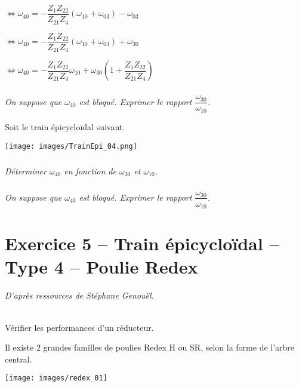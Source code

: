 \documentclass[10pt,fleqn]{article} %
\begin{document}
\begin{multicols}{2}
\begin{multicols}{2}
\begin{corrige}
  $\Leftrightarrow \omega_{40}=-\dfrac{Z_{1}Z_{22}}{Z_{21}Z_{4}}\left( \omega_{10}+\omega_{03} \right)-\omega_{03}$
  
    $\Leftrightarrow \omega_{40}=-\dfrac{Z_{1}Z_{22}}{Z_{21}Z_{4}}\left( \omega_{10}+\omega_{03} \right)+\omega_{30}$
    
      $\Leftrightarrow \omega_{40}=-\dfrac{Z_{1}Z_{22}}{Z_{21}Z_{4}}\omega_{10}+\omega_{30}\left( 1+\dfrac{Z_{1}Z_{22}}{Z_{21}Z_{4}} \right)$

 \end{corrige}
 \else
 \fi


\subparagraph{}
\textit{On suppose que $\omega_{40}$ est bloqué. Exprimer le rapport $\dfrac{\omega_{30}}{\omega_{10}}$.}



Soit le train épicycloïdal suivant. 

\begin{center}
 \texttt{[image: images/TrainEpi\_04.png]}
\end{center}

\subparagraph{}
\textit{Déterminer $\omega_{40}$ en fonction de  $\omega_{30}$ et $\omega_{10}$.}

\subparagraph{}
\textit{On suppose que $\omega_{40}$ est bloqué. Exprimer le rapport $\dfrac{\omega_{30}}{\omega_{10}}$.}



%

\section*{Exercice 5 -- Train épicycloïdal -- Type 4 -- Poulie Redex}
\setcounter{exo}{0}

\textit{D'après ressources de Stéphane Genouël.}


\begin{obj}~\\
Vérifier les performances d'un réducteur.
\end{obj}

Il existe 2 grandes familles de poulies Redex H ou SR, selon la forme de l’arbre central.


\begin{center}
\texttt{[image: images/redex\_01]}
\end{center}




\end{multicols}
\end{multicols}
\end{document}
